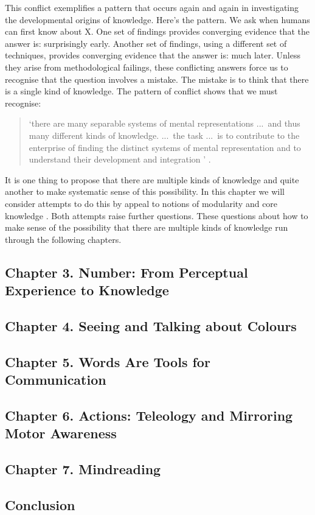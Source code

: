 \documentclass[12pt,\papersize]{extarticle}
\begin{document}
This conflict exemplifies a pattern that occurs again and again in investigating the developmental origins of knowledge. 
Here's the pattern.
We ask when humans can first know about X. 
One set of findings provides converging evidence that the answer is: surprisingly early.
Another set of findings, using a different set of techniques,  provides converging evidence that the answer is: much later. 
Unless they arise from methodological failings, these conflicting answers force us to recognise that the question involves a mistake. 
The mistake is to think that there is a single kind of knowledge. 
The pattern of conflict shows that we must recognise:
%
\begin{quote}
`there are many separable systems of mental representations ...\ and thus many different kinds of knowledge. ...\ the task ...\ is to contribute to the enterprise of finding the distinct systems of mental representation and to understand their development and integration%
'
\citep[p.\ 1522]{Hood:2000bf}.
\end{quote}
%
It is one thing to propose that there are multiple kinds of knowledge and quite another to make systematic sense of this possibility.
In this chapter we will consider attempts to do this by appeal to notions of modularity \citep{Fodor:1983dg}
and core knowledge \citep{Spelke:2007hb}. 
Both attempts raise further questions.  
These questions about how to make sense of the possibility that there are multiple kinds of knowledge 
run through the following chapters. 


\subsection{Chapter 3. Number: From Perceptual Experience to Knowledge}

\subsection{Chapter 4. Seeing and Talking about Colours}

\subsection{Chapter 5. Words Are Tools for Communication}

\subsection{Chapter 6. Actions: Teleology and Mirroring Motor Awareness}
\label{ch:actions}

\subsection{Chapter 7. Mindreading}

\subsection{Conclusion}



\end{document}
